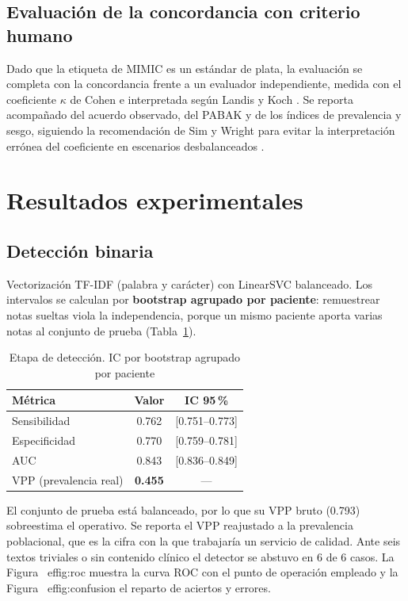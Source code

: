 \documentclass[conference]{IEEEtran}
\begin{document}
\subsection{Evaluación de la concordancia con criterio humano}
Dado que la etiqueta de MIMIC es un estándar de plata, la evaluación se
completa con la concordancia frente a un evaluador independiente, medida con el
coeficiente $\kappa$ de Cohen \cite{cohen} e interpretada según Landis y Koch
\cite{landis}. Se reporta acompañado del acuerdo observado, del PABAK
\cite{byrt} y de los índices de prevalencia y sesgo, siguiendo la
recomendación de Sim y Wright \cite{sim} para evitar la interpretación errónea
del coeficiente en escenarios desbalanceados \cite{feinstein}.

\section{Resultados experimentales}
\subsection{Detección binaria}
\label{sec:deteccion}
Vectorización TF-IDF (palabra y carácter) con LinearSVC balanceado. Los
intervalos se calculan por \textbf{bootstrap agrupado por paciente}: remuestrear
notas sueltas viola la independencia, porque un mismo paciente aporta varias
notas al conjunto de prueba (Tabla~\ref{tab:deteccion}).

\begin{table}[htbp]
\caption{Etapa de detección. IC por bootstrap agrupado por paciente}
\label{tab:deteccion}
\centering
\footnotesize
\begin{tabular}{@{}lcc@{}}
\toprule
\textbf{Métrica} & \textbf{Valor} & \textbf{IC 95\,\%} \\
\midrule
Sensibilidad & 0.762 & [0.751--0.773] \\
Especificidad & 0.770 & [0.759--0.781] \\
AUC & 0.843 & [0.836--0.849] \\
VPP (prevalencia real) & \textbf{0.455} & --- \\
\bottomrule
\end{tabular}
\end{table}

El conjunto de prueba está balanceado, por lo que su VPP bruto (0.793)
sobreestima el operativo. Se reporta el VPP reajustado a la prevalencia
poblacional, que es la cifra con la que trabajaría un servicio de calidad.
Ante seis textos triviales o sin contenido clínico el detector se abstuvo en
6 de 6 casos. La Figura~
ef{fig:roc} muestra la curva ROC con el
punto de operación empleado y la Figura~
ef{fig:confusion} el reparto de
aciertos y errores.
\end{document}

